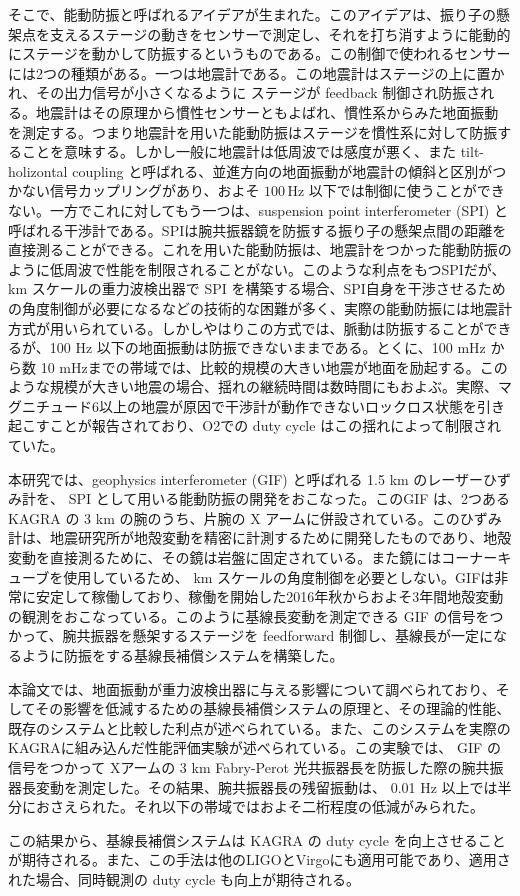 そこで、能動防振と呼ばれるアイデアが生まれた。このアイデアは、振り子の懸架点を支えるステージの動きをセンサーで測定し、それを打ち消すように能動的にステージを動かして防振するというものである。この制御で使われるセンサーには2つの種類がある。一つは地震計である。この地震計はステージの上に置かれ、その出力信号が小さくなるように ステージが feedback 制御され防振される。地震計はその原理から慣性センサーともよばれ、慣性系からみた地面振動を測定する。つまり地震計を用いた能動防振はステージを慣性系に対して防振することを意味する。しかし一般に地震計は低周波では感度が悪く、また tilt-holizontal coupling と呼ばれる、並進方向の地面振動が地震計の傾斜と区別がつかない信号カップリングがあり、およそ $100\,\mathrm{Hz}$ 以下では制御に使うことができない。一方でこれに対してもう一つは、suspension point interferometer (SPI) と呼ばれる干渉計である。SPIは腕共振器鏡を防振する振り子の懸架点間の距離を直接測ることができる。これを用いた能動防振は、地震計をつかった能動防振のように低周波で性能を制限されることがない。このような利点をもつSPIだが、km スケールの重力波検出器で SPI を構築する場合、SPI自身を干渉させるための角度制御が必要になるなどの技術的な困難が多く、実際の能動防振には地震計方式が用いられている。しかしやはりこの方式では、脈動は防振することができるが、100 Hz 以下の地面振動は防振できないままである。とくに、100 mHz から数 10 $\mathrm{mHz}$までの帯域では、比較的規模の大きい地震が地面を励起する。このような規模が大きい地震の場合、揺れの継続時間は数時間にもおよぶ。実際、マグニチュード6以上の地震が原因で干渉計が動作できないロックロス状態を引き起こすことが報告されており、O2での duty cycle はこの揺れによって制限されていた。

本研究では、geophysics interferometer (GIF) と呼ばれる 1.5 km のレーザーひずみ計を、 SPI として用いる能動防振の開発をおこなった。このGIF は、2つある KAGRA の 3 km の腕のうち、片腕の X アームに併設されている。このひずみ計は、地震研究所が地殻変動を精密に計測するために開発したものであり、地殻変動を直接測るために、その鏡は岩盤に固定されている。また鏡にはコーナーキューブを使用しているため、 km スケールの角度制御を必要としない。GIFは非常に安定して稼働しており、稼働を開始した2016年秋からおよそ3年間地殻変動の観測をおこなっている。このように基線長変動を測定できる GIF の信号をつかって、腕共振器を懸架するステージを feedforward 制御し、基線長が一定になるように防振をする基線長補償システムを構築した。

本論文では、地面振動が重力波検出器に与える影響について調べられており、そしてその影響を低減するための基線長補償システムの原理と、その理論的性能、既存のシステムと比較した利点が述べられている。また、このシステムを実際のKAGRAに組み込んだ性能評価実験が述べられている。この実験では、 GIF の信号をつかって Xアームの 3 km Fabry-Perot 光共振器長を防振した際の腕共振器長変動を測定した。その結果、腕共振器長の残留振動は、 0.01 Hz 以上では半分におさえられた。それ以下の帯域ではおよそ二桁程度の低減がみられた。

この結果から、基線長補償システムは KAGRA の duty cycle を向上させることが期待される。また、この手法は他のLIGOとVirgoにも適用可能であり、適用された場合、同時観測の duty cycle も向上が期待される。
